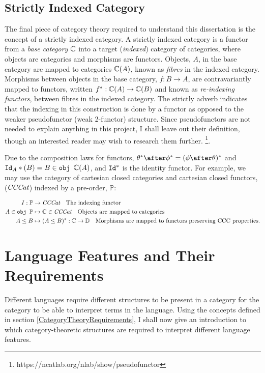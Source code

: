 \documentclass{Report}
\begin{document}
\subsection{Strictly Indexed Category}

The final piece of category theory required to understand this dissertation is the concept of a strictly indexed category. A strictly indexed category is a functor from a \textit{base category} $\mathbb{C}$ into a target (\textit{indexed}) category of categories, where objects are categories and morphisms are functors. Objects, $A$, in the base category are mapped to categories $\mathbb{C}(A)$, known as \textit{fibres} in the indexed category. Morphisms between objects in the base category, $f: B\rightarrow A$, are contravariantly mapped to functors, written $f^*: \mathbb{C}(A)\rightarrow \mathbb{C}(B)$ and known as \textit{re-indexing functors}, between fibres in the indexed category. The strictly adverb indicates that the indexing in this construction is done by a functor as opposed to the weaker pseudofunctor (weak 2-functor) structure. Since pseudofunctors are not needed to explain anything in this project, I shall leave out their definition, though an interested reader may wish to research them further. \footnote{https://ncatlab.org/nlab/show/pseudofunctor}. 


Due to the composition laws for functors, $\theta\star\after\phi\star = (\phi\after\theta)\star$ and $\texttt{Id}_{A}*(B) = B\in\texttt{obj } \mathbb{C}(A)$, and $\texttt{Id}_{}^*$ is the identity functor. For example, we may use the category of cartesian closed categories and cartesian closed functors, ($\textit{CCCat}$) indexed by a pre-order, $\mathbb{P}$:

\begin{align*}
    I: \mathbb{P} & \rightarrow \textit{CCCat}\quad\text{The indexing functor} \\
    A \in\texttt{obj }\mathbb{P} & \mapsto \mathbb{C} \in\textit{CCCat}\quad\text{Objects are mapped to categories}\\
    A \leq B & \mapsto (A \leq B)^*: \mathbb{C} \rightarrow \mathbb{D}\quad\text{Morphisms are mapped to functors preserving CCC properties.}
\end{align*}

\section{Language Features and Their Requirements}\label{LanguageFeatureRequirements}


Different languages require different structures to be present in a category for the category to be able to interpret terms in the language. Using the concepts defined in section \ref{CategoryTheoryRequirements}, I shall now give an introduction to which category-theoretic structures are required to interpret different language features. 
\end{document}
